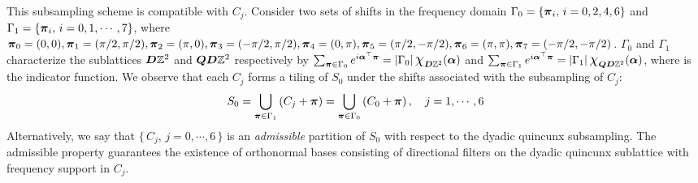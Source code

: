This subsampling scheme is compatible with $C_j$. Consider two sets of shifts in the frequency domain $\Gamma_0= \{\boldsymbol{\pi}_i,\, i = 0,2,4,6\}$ and $\Gamma_1 = \{\boldsymbol{\pi}_i,\, i = 0,1,\cdots,7\}$, where {\small $\boldsymbol{\pi}_0 = (0,0), \boldsymbol{\pi}_1 = (\pi/2,\pi/2), \boldsymbol{\pi}_2 = (\pi,0),\boldsymbol{\pi}_3 = (-\pi/2,\pi/2), \boldsymbol{\pi}_4 = (0,\pi), \boldsymbol{\pi}_5 = (\pi/2,-\pi/2),\boldsymbol{\pi}_6 = (\pi,\pi), \boldsymbol{\pi}_7=(-\pi/2,-\pi/2)$}. $\Gamma_0$ and $\Gamma_1$ characterize the sublattices $\boldsymbol{D}\mathbb{Z}^2$ and $\boldsymbol{QD}\mathbb{Z}^2$ respectively by
$\sum_{\V{\pi}\in\Gamma_0}e^{i\V{\alpha}^\top\V{\pi}} = |\Gamma_0| \, \scalebox{1.3}{$\chi$}_{\V{D}\mathbb{Z}^2}(\V{\alpha})$ and $ \sum_{\V{\pi}\in\Gamma_1}e^{i\V{\alpha}^\top\V{\pi}} = |\Gamma_1| \, \scalebox{1.3}{$\chi$}_{\V{QD}\mathbb{Z}^2}(\V{\alpha})$, where \scalebox{1.3}{$\chi$} is the indicator function. 
We observe that each $C_j$ forms a tiling of $S_0$ under the shifts associated with the subsampling of $C_j$:
\begin{align}\label{eq: tiling}
S_0 = \bigcup_{\boldsymbol{\pi}\in\Gamma_1}\left(C_j + \boldsymbol{\pi}\right) = \bigcup_{\boldsymbol{\pi}\in\Gamma_0}\left(C_0 + \boldsymbol{\pi}\right),\quad j = 1,\cdots,6
\end{align}
Alternatively, we say that $\{\,C_j,\, j = 0,\cdots,6\,\}$ is an {\it admissible} partition of $S_0$ with respect to the dyadic quincunx subsampling.
The admissible property guarantees the existence of orthonormal bases consisting of directional filters on the dyadic quincunx sublattice with frequency support in $C_j$.